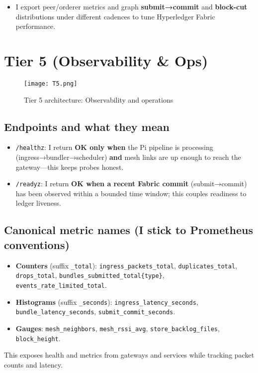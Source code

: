\documentclass[12pt]{article}
\begin{document}
\begin{itemize}
\item I export peer/orderer metrics and graph \textbf{submit→commit} and \textbf{block-cut} distributions under different cadences to tune Hyperledger Fabric performance.
\end{itemize}

\section{Tier 5 (Observability \& Ops)}

\begin{figure}[H]
\centering
\texttt{[image: T5.png]}
\caption{Tier 5 architecture: Observability and operations}
\end{figure}
\vspace{-0.5cm} %

\subsection{Endpoints and what they mean}

\begin{itemize}
\item \texttt{/healthz}: I return \textbf{OK only when} the Pi pipeline is processing (ingress→bundler→scheduler) \textbf{and} mesh links are up enough to reach the gateway—this keeps probes honest.
\item \texttt{/readyz}: I return \textbf{OK when a recent Fabric commit} (submit→commit) has been observed within a bounded time window; this couples readiness to ledger liveness.
\end{itemize}

\subsection{Canonical metric names (I stick to Prometheus conventions)}

\begin{itemize}
\item \textbf{Counters} (suffix \texttt{\_total}): \texttt{ingress\_packets\_total}, \texttt{duplicates\_total}, \texttt{drops\_total}, \texttt{bundles\_submitted\_total\{type\}}, \texttt{events\_rate\_limited\_total}.
\item \textbf{Histograms} (suffix \texttt{\_seconds}): \texttt{ingress\_latency\_seconds}, \texttt{bundle\_latency\_seconds}, \texttt{submit\_commit\_seconds}.
\item \textbf{Gauges}: \texttt{mesh\_neighbors}, \texttt{mesh\_rssi\_avg}, \texttt{store\_backlog\_files}, \texttt{block\_height}.
\end{itemize}
This exposes health and metrics from gateways and services while tracking packet counts and latency.
\end{document}
